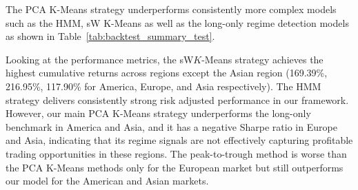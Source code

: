 \documentclass[11pt, a4paper]{article}
\begin{document}
The PCA K-Means strategy underperforms consistently more complex models such as the HMM, sW K-Means as well as the long-only regime detection models as shown in Table~\ref{tab:backtest_summary_test}.
\begin{table}[H]
\centering
\caption{Out-of-sample backtest (2020--2024) performance summary across regional indices.}
\label{tab:backtest_summary_test}
\end{table}
Looking at the performance metrics, the sW$K$-Means strategy achieves the highest cumulative returns across regions except the Asian region (169.39\%, 216.95\%, 117.90\% for America, Europe, and Asia respectively). 
The HMM strategy delivers consistently strong risk adjusted performance in our framework. However, our main PCA K-Means strategy underperforms the long-only benchmark in America and Asia, and it has a negative Sharpe ratio in Europe and Asia, indicating that its regime signals are not effectively capturing profitable trading opportunities in these regions. 
The peak-to-trough method is worse than the PCA K-Means methods only for the European market but still outperforms our model for the American and Asian markets. 
\end{document}
